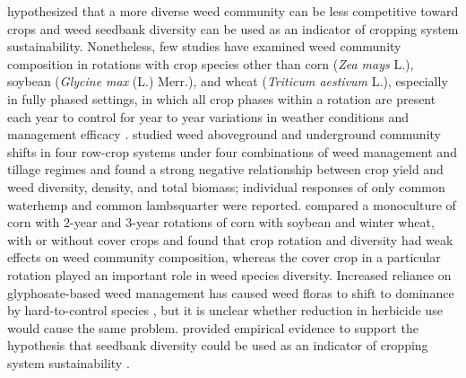 \documentclass[
]{article}
\begin{document}
\citet{storkeyWhatGoodWeed2018} hypothesized that a more diverse weed community can be less competitive toward crops and weed seedbank diversity can be used as an indicator of cropping system sustainability. Nonetheless, few studies have examined weed community composition in rotations with crop species other than corn (\emph{Zea mays} L.), soybean (\emph{Glycine max} (L.) Merr.), and wheat (\emph{Triticum aestivum} L.), especially in fully phased settings, in which all crop phases within a rotation are present each year to control for year to year variations in weather conditions and management efficacy \citep{payneDesignAnalysisLong2015}. \citet{davisWeedSeedbankCommunity2005} studied weed aboveground and underground community shifts in four row-crop systems under four combinations of weed management and tillage regimes and found a strong negative relationship between crop yield and weed diversity, density, and total biomass; individual responses of only common waterhemp and common lambsquarter were reported. \citet{smithAssemblyWeedCommunities2007} compared a monoculture of corn with 2-year and 3-year rotations of corn with soybean and winter wheat, with or without cover crops and found that crop rotation and diversity had weak effects on weed community composition, whereas the cover crop in a particular rotation played an important role in weed species diversity. Increased reliance on glyphosate-based weed management has caused weed floras to shift to dominance by hard-to-control species \citep{owenWeedSpeciesShifts2008}, but it is unclear whether reduction in herbicide use would cause the same problem. \citet{liebmanWeedSeedbankDiversity2021} provided empirical evidence to support the hypothesis that seedbank diversity could be used as an indicator of cropping system sustainability \citet{storkeyWhatGoodWeed2018}.
\end{document}
